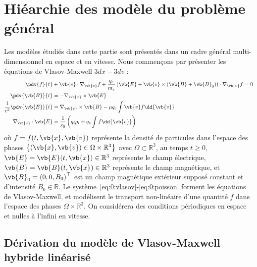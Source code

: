 
\section{Hiéarchie des modèle du problème général}

Les modèles étudiés dans cette partie sont présentés dans un cadre général multi-dimensionnel en espace et en vitesse. Nous commençons par présenter les équations de Vlasov-Maxwell $3dx-3dv$ :
\begin{align}
  \label{eq:0:vlasov}
    \pdv{f}{t} &+ \vb{v}\cdot\nabla_{\vb{x}} f + \frac{q_e}{m_e}\left( \vb{E} + \vb{v}\times(\vb{B}+\vb{B}_0) \right)\cdot\nabla_{\vb{v}} f = 0 \\
  \label{eq:0:maxwellB}
    \pdv{\vb{B}}{t} &= - \nabla_{\vb{x}}\times\vb{E} \\
  \label{eq:0:maxwellE}
    \frac{1}{c^2}\pdv{\vb{E}}{t} &= \nabla_{\vb{x}}\times \vb{B} - \mu q_e\int \vb{v} f\dd{\vb{v}} \\
  \label{eq:0:poisson}
    \nabla_{\vb{x}}\cdot\vb{E} &= \frac{1}{\varepsilon_0}\left( q_i\rho_i + q_e\int f\dd{\vb{v}} \right)
\end{align}
où $f=f(t,\vb{x},\vb{v})$ représente la densité de particules dans l'espace des phases $\left\{ (\vb{x},\vb{v}) \in \Omega\times\mathbb{R}^3 \right\}$ avec $\Omega\subset\mathbb{R}^3$, au temps $t\geq0$, $\vb{E}=\vb{E}(t,\vb{x})\in\mathbb{R}^3$ représente le champ électrique, $\vb{B}=\vb{B}(t,\vb{x})\in\mathbb{R}^3$ représente le champ magnétique, et $\vb{B}_0 = \left(0,0,B_0\right)^\top$ est un champ magnétique extérieur supposé constant et d'intensité $B_0\in\mathbb{R}$. Le système~\eqref{eq:0:vlasov}-\eqref{eq:0:poisson} forment les équations de Vlasov-Maxwell, et modélisent le transport non-linéaire d'une quantité $f$ dans l'espace des phases $\Omega\times\mathbb{R}^3$. On considérera des conditions périodiques en espace et nulles à l'infini en vitesse.

\subsection{Dérivation du modèle de Vlasov-Maxwell hybride linéarisé}

